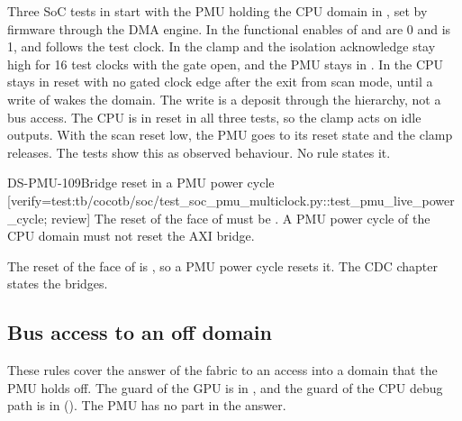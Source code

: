 \begin{information}
Three SoC tests in  start with the PMU holding the CPU domain in , set by firmware through the DMA engine. In  the functional enables of  and  are 0 and  is 1, and  follows the test clock. In  the clamp and the isolation acknowledge stay high for 16 test clocks with the gate open, and the PMU stays in . In  the CPU stays in reset with no gated clock edge after the exit from scan mode, until a write of  wakes the domain. The write is a deposit through the hierarchy, not a bus access. The CPU is in reset in all three tests, so the clamp acts on idle outputs. With the scan reset low, the PMU goes to its reset state and the clamp releases. The tests show this as observed behaviour. No rule states it.
\end{information}

\begin{requirement}{DS-PMU-109}{Bridge reset in a PMU power cycle}
[verify={test:tb/cocotb/soc/test_soc_pmu_multiclock.py::test_pmu_live_power_cycle; review}]
The reset of the  face of  must be . A PMU power cycle of the CPU domain must not reset the AXI bridge.
\end{requirement}
\begin{information}
The reset of the  face of  is , so a PMU power cycle resets it. The CDC chapter states the bridges.
\end{information}

\subsection{Bus access to an off domain}\label{ds:ch:mod-power-management:off-guard}
These rules cover the answer of the fabric to an access into a domain that the PMU holds off. The guard of the GPU is in , and the guard of the CPU debug path is in  (). The PMU has no part in the answer.

